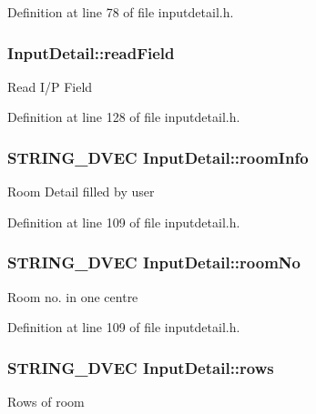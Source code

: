 \-Definition at line 78 of file inputdetail.\-h.

\hypertarget{classInputDetail_ac0cc70b017ef94fb55acb46fc44f0df5}{
\subsubsection[{read\-Field}]{ {\bf \-Input\-Detail\-::read\-Field}}}\label{db/d6e/classInputDetail_ac0cc70b017ef94fb55acb46fc44f0df5}
\-Read \-I/\-P \-Field 

\-Definition at line 128 of file inputdetail.\-h.

\hypertarget{classInputDetail_a7472fa615f318a2553b750529c3a4b0e}{
\subsubsection[{room\-Info}]{\setlength{\rightskip}{0pt plus 5cm}\-S\-T\-R\-I\-N\-G\-\_\-D\-V\-E\-C {\bf \-Input\-Detail\-::room\-Info}}}\label{db/d6e/classInputDetail_a7472fa615f318a2553b750529c3a4b0e}
\-Room \-Detail filled by user 

\-Definition at line 109 of file inputdetail.\-h.

\hypertarget{classInputDetail_a3193354764ba0b44b2eb4b366b4c273a}{
\subsubsection[{room\-No}]{\setlength{\rightskip}{0pt plus 5cm}\-S\-T\-R\-I\-N\-G\-\_\-D\-V\-E\-C {\bf \-Input\-Detail\-::room\-No}}}\label{db/d6e/classInputDetail_a3193354764ba0b44b2eb4b366b4c273a}
\-Room no. in one centre 

\-Definition at line 109 of file inputdetail.\-h.

\hypertarget{classInputDetail_aa203edbcfd4083624dbc4dc055c1e6e5}{
\subsubsection[{rows}]{\setlength{\rightskip}{0pt plus 5cm}\-S\-T\-R\-I\-N\-G\-\_\-D\-V\-E\-C {\bf \-Input\-Detail\-::rows}}}\label{db/d6e/classInputDetail_aa203edbcfd4083624dbc4dc055c1e6e5}
\-Rows of room 

